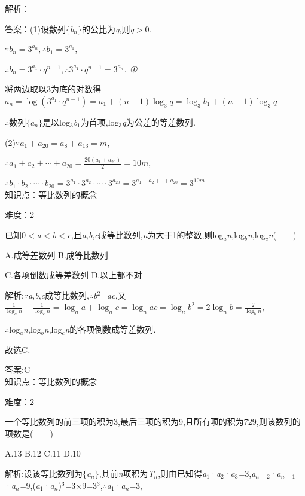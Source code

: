 \documentclass{article} %
\begin{document}
解析：

 答案：(1)设数列$\mathrm{\{}$\textit{b${}_{n}$}$\mathrm{\}}$的公比为\textit{q},则\textit{q$>$}0\textit{.}

$\because b_n=3^{a_n}, \therefore b_1=3^{a_1}$,

$\therefore b_n=3^{a_1}\cdot q^{n-1},\therefore 3^{a_1}\cdot q^{n-1}=3^{a_n}$\textit{. ①}

将两边取以3为底的对数得$a_n=\log(3^{a_1}\cdot q^{n-1})=a_1+(n-1)\log_3q=\log_3 b_1+(n-1)\log_3 q$

\textit{$\therefore$}数列$\mathrm{\{}$\textit{a${}_{n}$}$\mathrm{\}}$是以log${}_{3}$\textit{b}${}_{1}$为首项,log${}_{3}$\textit{q}为公差的等差数列\textit{.}

(2)$\because a_1+a_{20}=a_8+a_{13}=m$,

$\therefore a_1+a_2+\cdots +a_{20}=\frac{20(a_1+a_{20})}{2}=10m$,

$\therefore b_1\cdot b_2\cdot \cdots \cdot b_{20}=3^{a_1}\cdot 3^{a_2}\cdot \cdots \cdot 3^{a_{20}} = 3^{a_1+a_2+\cdot +a_{20}}=3^{10m}$ \\

知识点：等比数列的概念

难度：2

 已知0\textit{$<$a$<$b$<$c},且\textit{a},\textit{b},\textit{c}成等比数列,\textit{n}为大于1的整数,则log\textit{${}_{a}$n},log\textit{${}_{b}$n},log\textit{${}_{c}$n}(\textit{　　})

 A.成等差数列 B.成等比数列

 C.各项倒数成等差数列 D.以上都不对

 解析:\textit{$\because$a},\textit{b},\textit{c}成等比数列,\textit{$\therefore$b}${}^{2}$\textit{=ac},又$\frac{1}{\log_an}+\frac{1}{\log_c n}=\log_na+\log_nc=\log_nac=\log_nb^2=2\log_nb=\frac{2}{\log_b n}$,

\textit{$\therefore$}log\textit{${}_{a}$n},log\textit{${}_{b}$n},log\textit{${}_{c}$n}的各项倒数成等差数列\textit{.}

故选C\textit{.}

 答案:C \\

知识点：等比数列的概念

难度：2

 一个等比数列的前三项的积为3,最后三项的积为9,且所有项的积为729,则该数列的项数是(\textit{　　})

 A.13 B.12 C.11 D.10

 解析:设该等比数列为$\mathrm{\{}$\textit{a${}_{n}$}$\mathrm{\}}$,其前\textit{n}项积为\textit{T${}_{n}$},则由已知得\textit{a}${}_{1}$·\textit{a}${}_{2}$·\textit{a}${}_{3}$\textit{=}3,\textit{a${}_{n-}$}${}_{2}$·\textit{a${}_{n-}$}${}_{1}$·\textit{a${}_{n}$=}9,(\textit{a}${}_{1}$·\textit{a${}_{n}$})${}^{3}$\textit{=}3\textit{$\times$}9\textit{=}3${}^{3}$,\textit{$\therefore$a}${}_{1}$·\textit{a${}_{n}$=}3,
\end{document}
